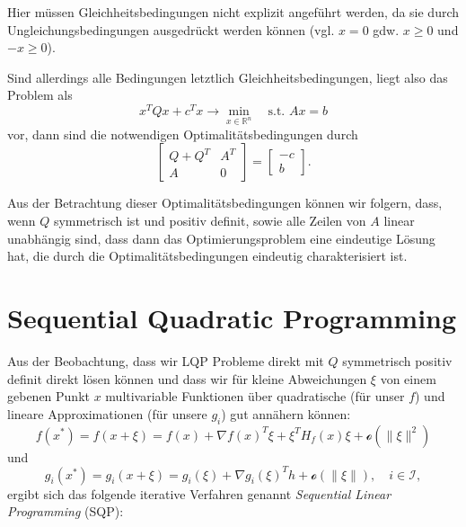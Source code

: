 \documentclass[]{book}
\theoremstyle{definition}
\theoremstyle{definition}
\theoremstyle{definition}
\theoremstyle{definition}
\theoremstyle{remark}
\begin{document}
Hier müssen Gleichheitsbedingungen nicht explizit angeführt werden, da sie durch Ungleichungsbedingungen ausgedrückt werden können (vgl. \(x=0\) gdw. \(x\geq0\) und \(-x\geq 0\)).

Sind allerdings alle Bedingungen letztlich Gleichheitsbedingungen, liegt also das Problem als
\begin{equation*}
x^T Q x + c^Tx  \to \min_{x\in \mathbb R^{n}} \quad \text{s.t. }Ax=b
\end{equation*}
vor, dann sind die notwendigen Optimalitätsbedingungen durch
\begin{equation*}
\begin{bmatrix}
Q+Q^T & A^T \\
A & 0
\end{bmatrix}
=
\begin{bmatrix}
-c \\ b
\end{bmatrix}.
\end{equation*}

Aus der Betrachtung dieser Optimalitätsbedingungen können wir folgern, dass, wenn \(Q\) symmetrisch ist und positiv definit,
sowie alle Zeilen von \(A\) linear unabhängig sind, dass dann das Optimierungsproblem eine eindeutige Lösung hat, die durch die Optimalitätsbedingungen eindeutig charakterisiert ist.

\hypertarget{sequential-quadratic-programming}{%
\section{Sequential Quadratic Programming}\label{sequential-quadratic-programming}}

Aus der Beobachtung, dass wir LQP Probleme direkt mit \(Q\) symmetrisch positiv definit direkt lösen können und dass wir für kleine Abweichungen \(\xi\) von einem gebenen Punkt \(x\) multivariable Funktionen über quadratische (für unser \(f\)) und lineare Approximationen (für unsere \(g_i\)) gut annähern können:
\begin{equation*}
f(x^*) = f(x+\xi) = f(x) + \nabla f(x)^T \xi + \xi^TH_f(x) \xi + \mathcal o(\| \xi \| ^2 )
\end{equation*}
und
\begin{equation*}
g_i(x^*) = g_i(x+\xi) = g_i(\xi) + \nabla g_i(\xi)^T h + \mathcal o(\| \xi \|), \quad i \in \mathcal I,
\end{equation*}
ergibt sich das folgende iterative Verfahren genannt \emph{Sequential Linear Programming} (SQP):
\end{document}
